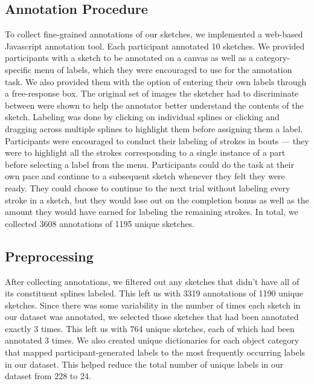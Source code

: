 \documentclass[10pt,letterpaper]{article}
\begin{document}
\subsection{Annotation Procedure}

To collect fine-grained annotations of our sketches, we implemented a web-based Javascript annotation tool. 
Each participant annotated 10 sketches. 
We provided participants with a sketch to be annotated on a canvas as well as a category-specific menu of labels, which they were encouraged to use for the annotation task. We also provided them with the option of entering their own labels through a free-response box. 
The original set of images the sketcher had to discriminate between were shown to help the annotator better understand the contents of the sketch.
Labeling was done by clicking on individual splines or clicking and dragging across multiple splines to highlight them before assigning them a label.
Participants were encouraged to conduct their labeling of strokes in bouts — they were to highlight all the strokes corresponding to a single instance of a part before selecting a label from the menu. 
Participants could do the task at their own pace and continue to a subsequent sketch whenever they felt they were ready. 
They could choose to continue to the next trial without labeling every stroke in a sketch, but they would lose out on the completion bonus as well as the amount they would have earned for labeling the remaining strokes.
\noindent In total, we collected 3608 annotations of 1195 unique sketches. 

\subsection{Preprocessing}
After collecting annotations, we filtered out any sketches that didn't have all of its constituent splines labeled. This left us with 3319 annotations of 1190 unique sketches.
Since there was some variability in the number of times each sketch in our dataset was annotated, we selected those sketches that had been annotated exactly 3 times. This left us with 764 unique sketches, each of which had been annotated 3 times.
We also created unique dictionaries for each object category that mapped participant-generated labels to the most frequently occurring labels in our dataset. This helped reduce the total number of unique labels in our dataset from 228 to 24.
\end{document}

